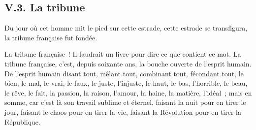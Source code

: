 \documentclass[french,twoside]{book} %
\begin{document}
\subsection[{V.3. La tribune}]{V.3. La tribune}
\noindent Du jour où cet homme mit le pied sur cette estrade, cette estrade se transfigura, la tribune française fut fondée.\par
La tribune française ! Il faudrait un livre pour dire ce que contient ce mot. La tribune française, c’est, depuis soixante ans, la bouche ouverte de l’esprit humain. De l’esprit humain disant tout, mêlant tout, combinant tout, fécondant tout, le bien, le mal, le vrai, le faux, le juste, l’injuste, le haut, le bas, l’horrible, le beau, le rêve, le fait, la passion, la raison, l’amour, la haine, la matière, l’idéal ; mais en somme, car c’est là son travail sublime et éternel, faisant la nuit pour en tirer le jour, faisant le chaos pour en tirer la vie, faisant la Révolution pour en tirer la République.\par
\end{document}
